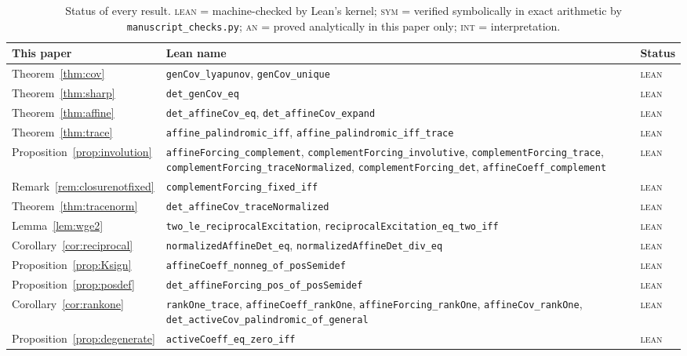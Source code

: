 \documentclass[11pt]{article}
\theoremstyle{plain}
\theoremstyle{definition}
\theoremstyle{remark}
\begin{document}
\begin{table}[t]
\centering
\caption{Status of every result. \textsc{lean} = machine-checked by Lean's kernel;
\textsc{sym} = verified symbolically in exact arithmetic by \texttt{manuscript\_checks.py};
\textsc{an} = proved analytically in this paper only; \textsc{int} = interpretation.}
\label{tab:lean}
\small
\begin{tabular}{@{}l p{} l@{}}
\toprule
This paper & Lean name & Status\\
\midrule
Theorem~\ref{thm:cov} & \texttt{genCov\_lyapunov}, \texttt{genCov\_unique} & \textsc{lean}\\
Theorem~\ref{thm:sharp} & \texttt{det\_genCov\_eq} & \textsc{lean}\\
Theorem~\ref{thm:affine} & \texttt{det\_affineCov\_eq}, \texttt{det\_affineCov\_expand} & \textsc{lean}\\
Theorem~\ref{thm:trace} & \texttt{affine\_palindromic\_iff}, \texttt{affine\_palindromic\_iff\_trace} & \textsc{lean}\\
Proposition~\ref{prop:involution} & \texttt{affineForcing\_complement}, \texttt{complementForcing\_involutive}, \texttt{complementForcing\_trace}, \texttt{complementForcing\_traceNormalized}, \texttt{complementForcing\_det}, \texttt{affineCoeff\_complement} & \textsc{lean}\\
Remark~\ref{rem:closurenotfixed} & \texttt{complementForcing\_fixed\_iff} & \textsc{lean}\\
Theorem~\ref{thm:tracenorm} & \texttt{det\_affineCov\_traceNormalized} & \textsc{lean}\\
Lemma~\ref{lem:wge2} & \texttt{two\_le\_reciprocalExcitation}, \texttt{reciprocalExcitation\_eq\_two\_iff} & \textsc{lean}\\
Corollary~\ref{cor:reciprocal} & \texttt{normalizedAffineDet\_eq}, \texttt{normalizedAffineDet\_div\_eq} & \textsc{lean}\\
Proposition~\ref{prop:Ksign} & \texttt{affineCoeff\_nonneg\_of\_posSemidef} & \textsc{lean}\\
Proposition~\ref{prop:posdef} & \texttt{det\_affineForcing\_pos\_of\_posSemidef} & \textsc{lean}\\
Corollary~\ref{cor:rankone} & \texttt{rankOne\_trace}, \texttt{affineCoeff\_rankOne}, \texttt{affineForcing\_rankOne}, \texttt{affineCov\_rankOne}, \texttt{det\_activeCov\_palindromic\_of\_general} & \textsc{lean}\\
Proposition~\ref{prop:degenerate} & \texttt{activeCoeff\_eq\_zero\_iff} & \textsc{lean}\\

\end{tabular}
\end{table}
\end{document}
